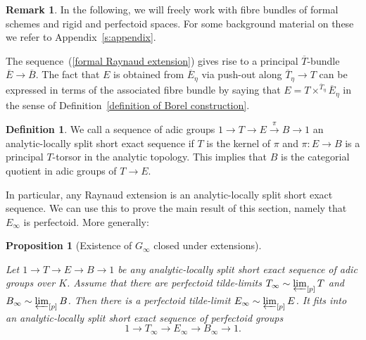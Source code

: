 \documentclass[10pt,oneside]{amsart}
\newtheorem{proposition}[theorem]{Proposition}
\theoremstyle{definition}
\newtheorem{definition}[theorem]{Definition}
\newtheorem{remark}[theorem]{Remark}
\begin{document}
	
	\begin{remark}
	In the following, we will freely work with fibre bundles of formal schemes and rigid and perfectoid spaces. For some background material on these we refer to Appendix~\ref{s:appendix}.
	\end{remark}
	
	The sequence~(\ref{formal Raynaud extension}) gives rise to a principal $\overline{T}$-bundle
	$\overline{E}\rightarrow \overline{B}$. The fact that $E$ is obtained from $\overline{E}_\eta$ via push-out along $\overline{T}_\eta\rightarrow T$ can be expressed in terms of the associated fibre bundle by saying that $E = T\times^{\overline{T}_\eta}\overline{E}_\eta$ in the sense of Definition~\ref{definition of Borel construction}.
	\begin{definition}
		We call a sequence of adic groups $1\to T\to E\xrightarrow{\pi} B\to 1$ an analytic-locally split short exact sequence if $T$ is the kernel of $\pi$ and $\pi:E\to B$ is a principal $T$-torsor in the analytic topology. This implies that $B$ is the categorial quotient in adic groups of $T\to E$.
	\end{definition}
	In particular, any Raynaud extension is an analytic-locally split short exact sequence. We can use this to prove the main result of this section, namely that $E_\infty$ is perfectoid. More generally:
	\begin{proposition}[Existence of $G_\infty$ closed under extensions]\label{p-F-formal tower exists for E}
		
		Let $1\to T\to E\to B\to 1$ be any analytic-locally split short exact sequence of adic groups over $K$. Assume that there are perfectoid tilde-limits $T_\infty \sim \varprojlim_{[p]} T$ and $B_\infty\sim \varprojlim_{[p]}B$. Then
		there is a perfectoid tilde-limit $E_\infty\sim \varprojlim_{[p]}E$. It fits into an analytic-locally split short exact sequence of perfectoid groups 
		\[1\to T_\infty\to E_\infty\to B_\infty\to 1.\]
	\end{proposition}
\end{document}
